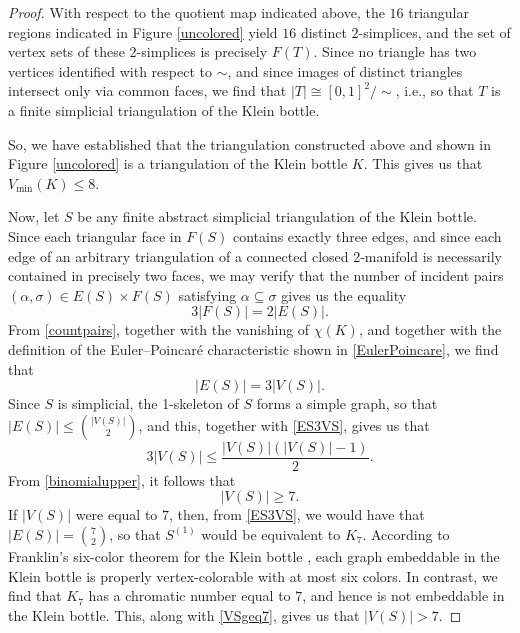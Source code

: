 \documentclass[12pt]{article}
\begin{document}
\begin{proof}
 With respect to the quotient map indicated above, the $16$ triangular regions indicated in Figure \ref{uncolored}
 yield $16$ distinct $2$-simplices, and the set of vertex sets of these $2$-simplices is precisely $F(T)$. 
 Since no triangle has two vertices identified with respect to $\sim$, and since images of distinct triangles intersect 
 only via common faces, we find that $|T| \cong [0, 1]^2 / \sim$, 
 i.e., so that $T$ is a finite simplicial triangulation of the Klein bottle. 

 So, we have established that the triangulation constructed above and shown in Figure \ref{uncolored} is a triangulation of the Klein 
 bottle $K$. This gives us that $V_{\min}(K) \leq 8$. 
 
 Now, let $S$ be any finite abstract simplicial triangulation of the Klein bottle. Since each triangular face in $F(S)$ contains exactly three 
 edges, and since each edge of an arbitrary triangulation of a connected closed 2-manifold is necessarily contained in precisely two faces, 
 we may verify that the number of incident pairs $(\alpha, \sigma) \in E(S) \times F(S)$ satisfying $\alpha \subseteq \sigma$ gives us 
 the equality 
\begin{equation}\label{countpairs} 
 3 \left| F(S) \right| = 2 \left| E(S) \right|. 
\end{equation}
 From \eqref{countpairs}, together with the vanishing of $\chi(K)$, and together with the definition of the Euler--Poincar\'{e}
 characteristic shown in \eqref{EulerPoincare}, we find that 
\begin{equation}\label{ES3VS} 
 \left| E(S) \right| = 3 \left| V(S) \right|. 
\end{equation} 
 Since $S$ is simplicial, the 1-skeleton of $S$ forms a simple graph, so that 
 $ \left| E(S) \right| \leq \binom{ \left| V(S) \right| }{2}$, 
 and this, together with 
 \eqref{ES3VS}, gives us that 
\begin{equation}\label{binomialupper} 
 3 \left| V(S) \right| \leq \frac{ \left| V(S) \right| \left( \left| V(S) \right| - 1 \right) }{2}. 
\end{equation}
 From \eqref{binomialupper}, it follows that 
\begin{equation}\label{VSgeq7} 
 \left| V(S) \right| \geq 7. 
\end{equation} 
 If $\left| V(S) \right|$ were equal to $7$, then, from \eqref{ES3VS}, we would have that $\left| E(S) \right| = \binom{ 7 }{2}$, so that 
 $S^{(1)}$ would be equivalent to $K_7$. According to Franklin's six-color theorem for the Klein bottle \cite{Franklin1934}, each graph 
 embeddable in the Klein bottle is properly vertex-colorable with at most six colors. 
 In contrast, we find that $K_{7}$ has a chromatic number equal to $7$, 
 and hence is not embeddable in the Klein bottle. 
 This, along with \eqref{VSgeq7}, gives us that $\left| V(S) \right| > 7$. 


\end{proof}
\end{document}

